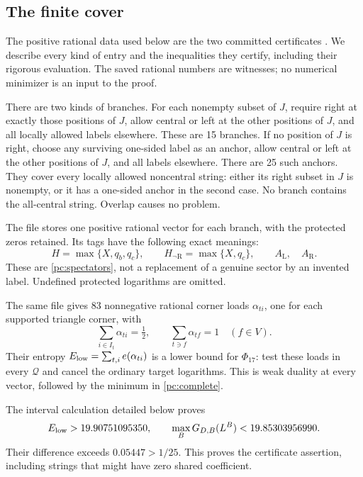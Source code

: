 \documentclass[11pt]{article}
\numberwithin{equation}{section}
\theoremstyle{definition}\newtheorem{definition}[theorem]{Definition}
\theoremstyle{remark}\newtheorem{remark}[theorem]{Remark}
\newcommand{\Lft}{\mathrm L}
\newcommand{\Rgt}{\mathrm R}
\newcommand{\calQ}{\mathcal Q}
\begin{document}
\subsection{The finite cover}
The positive rational data used below are the two committed
certificates \cite{CoverData,AnchorData}. We describe every kind
of entry and the inequalities they certify, including their
rigorous evaluation. The saved rational numbers are witnesses;
no numerical minimizer is an input to the proof.

There are two kinds of branches. For each nonempty subset of \(J\),
require right at exactly those positions of \(J\), allow central
or left at the other positions of \(J\), and all locally allowed
labels elsewhere. These are 15 branches. If no position of \(J\)
is right, choose any surviving one-sided label as an anchor, allow
central or left at the other positions of \(J\), and all labels
elsewhere. There are 25 such anchors. They cover every locally
allowed noncentral string: either its right subset in \(J\) is
nonempty, or it has a one-sided anchor in the second case.
No branch contains the all-central string. Overlap causes no
problem.

The file \cite{CoverData} stores one positive rational vector for
each branch, with the protected zeros retained. Its tags have the
following exact meanings:
\[
 H=\max\{X,q_b,q_c\},\qquad
 H_{\neg\Rgt}=\max\{X,q_c\},\qquad A_\Lft,\quad A_\Rgt .
\]
These are \eqref{pc:spectators}, not a replacement of a genuine
sector by an invented label. Undefined protected logarithms are
omitted.

The same file gives 83 nonnegative rational corner loads
\(\alpha_{ti}\), one for each supported triangle corner, with
\[
 \sum_{i\in I_t}\alpha_{ti}=\tfrac12,\qquad
                \sum_{t\ni f}\alpha_{tf}=1\quad(f\in V).
\]
Their entropy \(E_{\rm low}=\sum_{t,i}e(\alpha_{ti})\) is a
lower bound for \(\Phi_{17}\): test these loads in every
\(\calQ\) and cancel the ordinary target logarithms. This is
weak duality at every vector, followed by the minimum in
\eqref{pc:complete}.

The interval calculation detailed below proves
\begin{equation}\label{pc:seed-cover-values}
 E_{\rm low}>19.90751095350,\qquad
       \max_B G_{D,B}(L^B)<19.85303956990.
\end{equation}
Their difference exceeds \(0.05447>1/25\). This proves the
certificate assertion, including strings that might have zero
shared coefficient.
\end{document}

